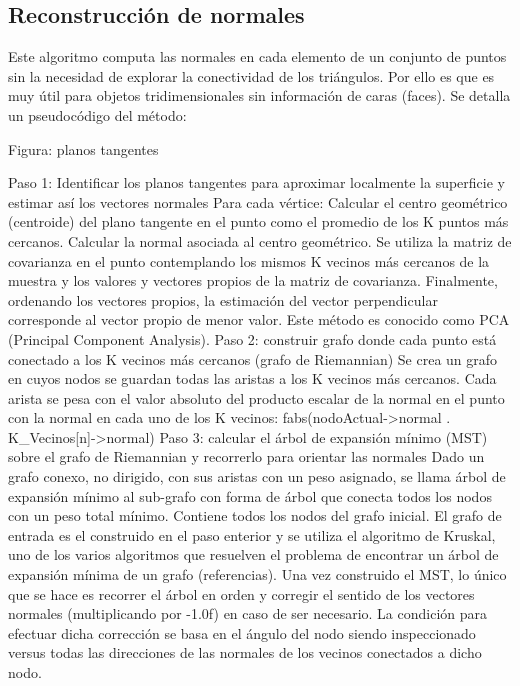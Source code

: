 \subsection{Reconstrucción de normales}

Este algoritmo computa las normales en cada elemento de un conjunto de puntos sin la necesidad de explorar la conectividad de los triángulos. Por ello es que es muy útil para objetos tridimensionales sin información de caras (faces).
Se detalla un pseudocódigo del método:

Figura: planos tangentes

Paso 1: Identificar los planos tangentes para aproximar localmente la superficie y estimar así los vectores normales
   Para cada vértice:
Calcular el centro geométrico (centroide) del plano tangente en el punto como el promedio de los K puntos más cercanos.
Calcular la normal asociada al centro geométrico. Se utiliza la matriz de covarianza en el punto contemplando los mismos K vecinos más cercanos de la muestra y los valores y vectores propios de la matriz de covarianza. Finalmente, ordenando los vectores propios, la estimación del vector perpendicular corresponde al vector propio de menor valor. Este método es conocido como PCA (Principal Component Analysis).
Paso 2: construir grafo donde cada punto está conectado a los K vecinos más cercanos (grafo de Riemannian)
   Se crea un grafo en cuyos nodos se guardan todas las aristas a los K vecinos más cercanos. Cada arista se pesa con el valor absoluto del producto escalar de la normal en el punto con la normal en cada uno de los K vecinos:
   fabs(nodoActual->normal . K\_Vecinos[n]->normal)
Paso 3: calcular el árbol de expansión mínimo (MST) sobre el grafo de Riemannian y recorrerlo para orientar las normales
Dado un grafo conexo, no dirigido, con sus aristas con un peso asignado, se llama árbol de expansión mínimo al sub-grafo con forma de árbol que conecta todos los nodos con un peso total mínimo. Contiene todos los nodos del grafo inicial. El grafo de entrada es el construido en el paso enterior y se utiliza el algoritmo de Kruskal, uno de los varios algoritmos que resuelven el problema de encontrar un árbol de expansión mínima de un grafo (referencias).
Una vez construido el MST, lo único que se hace es recorrer el árbol en orden y corregir el sentido de los vectores normales (multiplicando por -1.0f) en caso de ser necesario. La condición para efectuar dicha corrección se basa en el ángulo del nodo siendo inspeccionado versus todas las direcciones de las normales de los vecinos conectados a dicho nodo.

